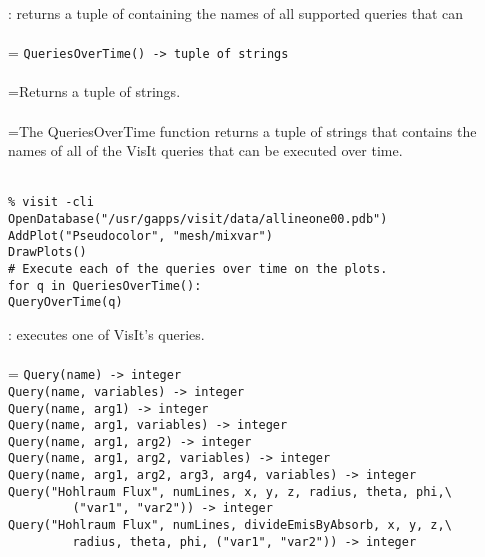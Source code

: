 \documentclass[10pt,a4paper]{report}
\begin{document}
{}
: returns a tuple of containing the names of all supported queries that can\\[-3mm]

 \\ 
\hangindent=\parindent 
\verb!QueriesOverTime() -> tuple of strings!\\ [-3mm]

 \\ 
\hangindent=\parindent Returns a tuple of strings. \\[-3mm] 

 \\ 
\hangindent=\parindent The QueriesOverTime function returns a tuple of strings that contains the names of all of the VisIt queries that can be executed over time. \\[-3mm] 

\\[-6mm]
\begin{verbatim}% visit -cli
OpenDatabase("/usr/gapps/visit/data/allineone00.pdb")
AddPlot("Pseudocolor", "mesh/mixvar")
DrawPlots()
# Execute each of the queries over time on the plots.
for q in QueriesOverTime():
QueryOverTime(q)
\end{verbatim}
\newpage


{}
: executes one of VisIt's queries.\\[-3mm]

 \\ 
\hangindent=\parindent 
\verb!Query(name) -> integer!\\ 
\verb!Query(name, variables) -> integer!\\ 
\verb!Query(name, arg1) -> integer!\\ 
\verb!Query(name, arg1, variables) -> integer!\\ 
\verb!Query(name, arg1, arg2) -> integer!\\ 
\verb!Query(name, arg1, arg2, variables) -> integer!\\ 
\verb!Query(name, arg1, arg2, arg3, arg4, variables) -> integer!\\
\verb!Query("Hohlraum Flux", numLines, x, y, z, radius, theta, phi,\ ! \\ 
\verb!         ("var1", "var2")) -> integer!\\
\verb!Query("Hohlraum Flux", numLines, divideEmisByAbsorb, x, y, z,\ ! \\ 
\verb!         radius, theta, phi, ("var1", "var2")) -> integer!\\ [-3mm]
\end{document}
